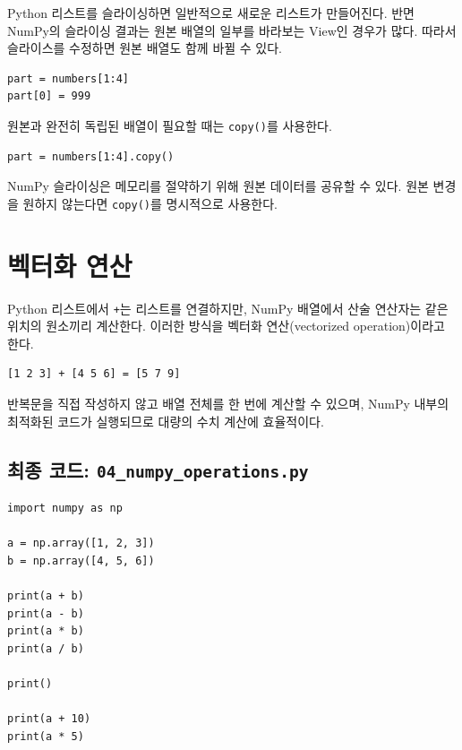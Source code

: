 \documentclass[11pt,a4paper]{article}
\begin{document}
Python 리스트를 슬라이싱하면 일반적으로 새로운 리스트가 만들어진다. 반면 NumPy의 슬라이싱 결과는 원본 배열의 일부를 바라보는 View인 경우가 많다. 따라서 슬라이스를 수정하면 원본 배열도 함께 바뀔 수 있다.

\begin{lstlisting}
part = numbers[1:4]
part[0] = 999
\end{lstlisting}

원본과 완전히 독립된 배열이 필요할 때는 \texttt{copy()}를 사용한다.

\begin{lstlisting}
part = numbers[1:4].copy()
\end{lstlisting}

\begin{importantbox}
NumPy 슬라이싱은 메모리를 절약하기 위해 원본 데이터를 공유할 수 있다. 원본 변경을 원하지 않는다면 \texttt{copy()}를 명시적으로 사용한다.
\end{importantbox}

\section{벡터화 연산}

Python 리스트에서 \texttt{+}는 리스트를 연결하지만, NumPy 배열에서 산술 연산자는 같은 위치의 원소끼리 계산한다. 이러한 방식을 벡터화 연산(vectorized operation)이라고 한다.

\begin{verbatim}
[1 2 3] + [4 5 6] = [5 7 9]
\end{verbatim}

반복문을 직접 작성하지 않고 배열 전체를 한 번에 계산할 수 있으며, NumPy 내부의 최적화된 코드가 실행되므로 대량의 수치 계산에 효율적이다.

\subsection{최종 코드: \texttt{04\_numpy\_operations.py}}

\begin{lstlisting}
import numpy as np

a = np.array([1, 2, 3])
b = np.array([4, 5, 6])

print(a + b)
print(a - b)
print(a * b)
print(a / b)

print()

print(a + 10)
print(a * 5)
\end{lstlisting}
\end{document}
